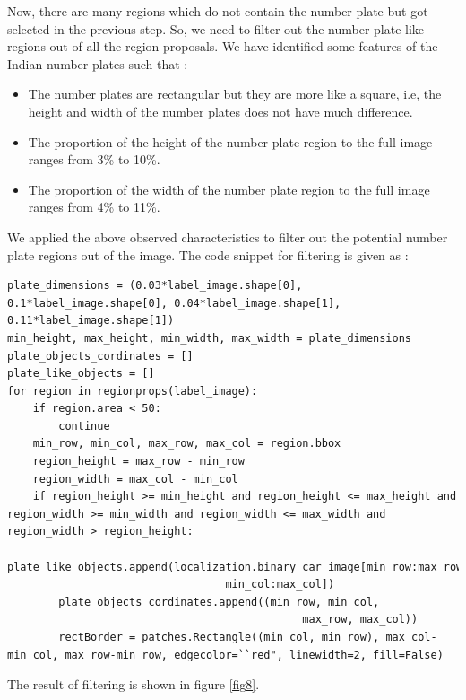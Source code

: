 \begin{itemize}
 
 
Now, there are many regions which do not contain the number plate but got selected in the previous step. So, we need to filter out the number plate like regions out of all the region proposals. We have identified some features of the Indian number plates such that : 
 \begin{itemize}
     \item The number plates are rectangular but they are more like a square, i.e, the height and width of the number plates does not have much difference.
     \item The proportion of the height of the number plate region to the full image ranges from 3\% to 10\%.
     \item The proportion of the width of the number plate region to the full image ranges from 4\% to 11\%.
 \end{itemize}
 \par We applied the above observed characteristics to filter out the potential number plate regions out of the image. The code snippet for filtering is given as : 
 \begin{lstlisting}[caption=Number Plate Filtering]
 plate_dimensions = (0.03*label_image.shape[0], 0.1*label_image.shape[0], 0.04*label_image.shape[1], 0.11*label_image.shape[1])
min_height, max_height, min_width, max_width = plate_dimensions
plate_objects_cordinates = []
plate_like_objects = []
for region in regionprops(label_image):
    if region.area < 50:
        continue
    min_row, min_col, max_row, max_col = region.bbox
    region_height = max_row - min_row
    region_width = max_col - min_col
    if region_height >= min_height and region_height <= max_height and region_width >= min_width and region_width <= max_width and region_width > region_height:
        plate_like_objects.append(localization.binary_car_image[min_row:max_row,
                                  min_col:max_col])
        plate_objects_cordinates.append((min_row, min_col,
                                              max_row, max_col))
        rectBorder = patches.Rectangle((min_col, min_row), max_col-min_col, max_row-min_row, edgecolor=``red", linewidth=2, fill=False)
 \end{lstlisting}
 \end{itemize}
 
 \vspace{.3in}
 The result of filtering is shown in figure \ref{fig8}.
 

